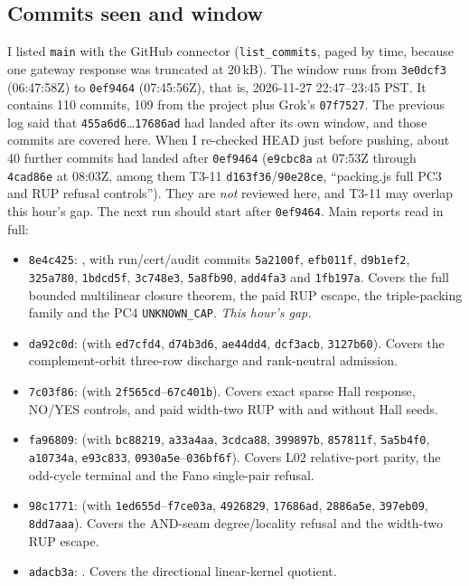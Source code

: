 \documentclass[11pt]{article}
\theoremstyle{remark}
\begin{document}
\subsection{Commits seen and window}
I listed \texttt{main} with the GitHub connector (\texttt{list\_commits}, paged by time,
because one gateway response was truncated at 20\,kB). The window runs from \texttt{3e0dcf3}
(06:47:58Z) to \texttt{0ef9464} (07:45:56Z), that is, 2026-11-27 22:47--23:45 PST. It contains
110 commits, 109 from the project plus Grok's \texttt{07f7527}. The previous log said that
\texttt{455a6d6}\ldots\texttt{17686ad} had landed after its own window, and those commits are
covered here. When I re-checked HEAD just before pushing, about 40 further commits had
landed after \texttt{0ef9464} (\texttt{e9cbc8a} at 07:53Z through \texttt{4cad86e} at 08:03Z,
among them T3-11 \texttt{d163f36}/\texttt{90e28ce}, ``packing.js full PC3 and RUP refusal
controls''). They are \emph{not} reviewed here, and T3-11 may overlap this hour's gap. The next
run should start after \texttt{0ef9464}. Main reports read in full:
\begin{itemize}
\item \texttt{8e4c425}: ,
with run/cert/audit commits \texttt{5a2100f}, \texttt{efb011f}, \texttt{d9b1ef2}, \texttt{325a780}, \texttt{1bdcd5f},
\texttt{3c748e3}, \texttt{5a8fb90}, \texttt{add4fa3} and \texttt{1fb197a}. Covers the full bounded multilinear closure theorem,
the paid RUP escape, the triple-packing family and the PC4 \texttt{UNKNOWN\_CAP}. \emph{This hour's gap.}
\item \texttt{da92c0d}: 
(with \texttt{ed7cfd4}, \texttt{d74b3d6}, \texttt{ae44dd4}, \texttt{dcf3acb}, \texttt{3127b60}). Covers the complement-orbit
three-row discharge and rank-neutral admission.
\item \texttt{7c03f86}: 
(with \texttt{2f565cd}--\texttt{67c401b}). Covers exact sparse Hall response, NO/YES
controls, and paid width-two RUP with and without Hall seeds.
\item \texttt{fa96809}: 
(with \texttt{bc88219}, \texttt{a33a4aa}, \texttt{3cdca88}, \texttt{399897b}, \texttt{857811f}, \texttt{5a5b4f0}, \texttt{a10734a},
\texttt{e93c833}, \texttt{0930a5e}--\texttt{036bf6f}). Covers L02 relative-port parity, the odd-cycle terminal and the Fano
single-pair refusal.
\item \texttt{98c1771}: 
(with \texttt{1ed655d}--\texttt{f7ce03a}, \texttt{4926829}, \texttt{17686ad}, \texttt{2886a5e}, \texttt{397eb09}, \texttt{8dd7aaa}).
Covers the AND-seam degree/locality refusal and the width-two RUP escape.
\item \texttt{adacb3a}: .
Covers the directional linear-kernel quotient.
\end{itemize}
\end{document}
